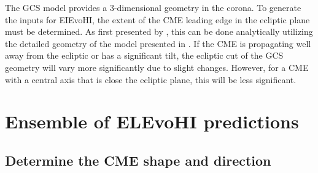 \documentclass[draft]{agujournal}
\begin{document}
The GCS model provides a 3-dimensional geometry in the corona. To generate the inputs for EIEvoHI, the extent of the CME leading edge in the ecliptic plane must be determined. As first presented by \citet{col13}, this can be done analytically utilizing the detailed geometry of the model presented in \citet{the11}. If the CME is propagating well away from the ecliptic or has a significant tilt, the ecliptic cut of the GCS geometry will vary more significantly due to slight changes. However, for a CME with a central axis that is close the ecliptic plane, this will be less significant.



\section{Ensemble of ELEvoHI predictions}

\subsection{Determine the CME shape and direction}
\end{document}
